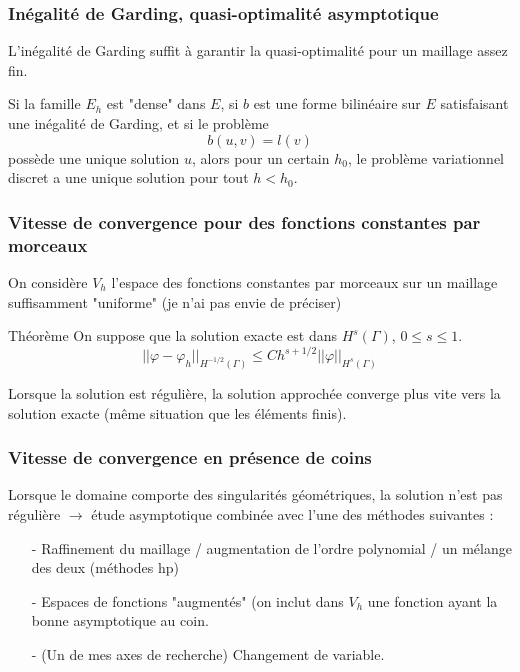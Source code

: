 \documentclass[11pt]{beamer}
\begin{document}
	\begin{frame}
		\frametitle{Inégalité de Garding, quasi-optimalité asymptotique}
		L'inégalité de Garding suffit à garantir la quasi-optimalité pour un maillage assez fin. 
		\begin{Theorem}
			Si la famille $E_h$ est "dense" dans $E$, si $b$ est une forme bilinéaire sur $E$ satisfaisant une inégalité de Garding, et si le problème 
			\[b(u,v) = l(v)\]
			possède une unique solution $u$, alors pour un certain $h_0$, le problème variationnel discret a une unique solution pour tout $h < h_0$. 
		\end{Theorem}
	\end{frame}
	\begin{frame}
		\frametitle{Vitesse de convergence pour des fonctions constantes par morceaux}
		On considère $V_h$ l'espace des fonctions constantes par morceaux sur un maillage suffisamment "uniforme" (je n'ai pas envie de préciser)
		\begin{block}{Théorème}
			On suppose que la solution exacte est dans $H^s(\Gamma)$, $0 \leq s \leq 1$. 
			\[|| \varphi - \varphi_h||_{H^{-1/2}(\Gamma)} \leq C h^{s+1/2}||\varphi||_{H^s(\Gamma)}\]
		\end{block}
		Lorsque la solution est régulière, la solution approchée converge plus vite vers la solution exacte (même situation que les éléments finis). 
		
	\end{frame}
	\begin{frame}\frametitle{Vitesse de convergence en présence de coins}
		Lorsque le domaine comporte des singularités géométriques, la solution n'est pas régulière $\to$ étude asymptotique combinée avec l'une des méthodes suivantes : 
		\begin{itemize}
			\item[-] Raffinement du maillage / augmentation de l'ordre polynomial / un mélange des deux (méthodes hp)
			\item[-] Espaces de fonctions "augmentés" (on inclut dans $V_h$ une fonction ayant la bonne asymptotique au coin. 
			\item[-] (Un de mes axes de recherche) Changement de variable. 
		\end{itemize}
	\end{frame}
	
\end{document}
